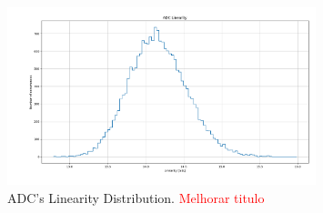 \begin{figure}[H]

    \centering
    \includegraphics*[width=0.8\textwidth]{Images/LIN_All_Caps_20Ksim_s0011.png}
    \caption{ADC's Linearity Distribution. \textcolor{red}{Melhorar titulo}}

    \label{fig:ADC_LIN_ALLCAPS}
\end{figure}


